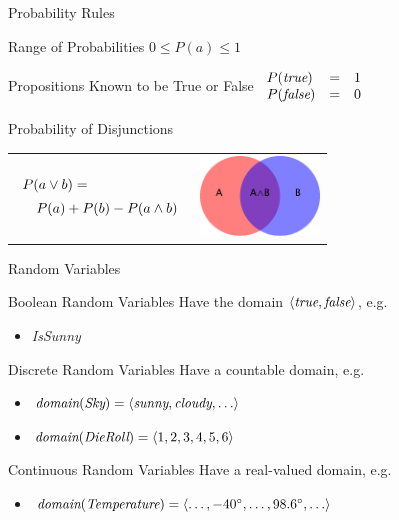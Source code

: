 \documentclass[12pt]{beamer}
\newcommand{\EM}[1]{\mbox{\em#1}}
\begin{document}
\begin{frame}{Probability Rules}
	\begin{block}{Range of Probabilities}
		$0 \leq P(a) \leq 1$
	\end{block}
	\pause
	\begin{block}{Propositions Known to be True or False}
		$
		\begin{array}{lll}
			P(\EM{true})  & = & 1 \\
			P(\EM{false}) & = & 0 \\
		\end{array}
		$
	\end{block}
	\pause
	\begin{block}{Probability of Disjunctions}
		\begin{tabular}{lc}
			$
			\begin{array}{lc}
				\lefteqn{P(a \lor b) = \mbox{}} \\[.5em]
				& P(a) + P(b) - P(a \land b)
			\end{array}
			$
			&
			\pause
			\parbox{1.25in}{\includegraphics[width=1.25in]{venn}}
		\end{tabular}
	\end{block}
\end{frame}
\begin{frame}{Random Variables}
	\begin{block}{Boolean Random Variables}
		Have the domain $\langle \EM{true}, \EM{false} \rangle$, e.g.
		\begin{itemize}
			\item \EM{IsSunny}
		\end{itemize}
	\end{block}
	\pause
	\begin{block}{Discrete Random Variables}
		Have a countable domain, e.g.
		\begin{itemize}
			\item $\EM{domain}(\EM{Sky}) =
			       \langle \EM{sunny}, \EM{cloudy}, \ldots \rangle$
			\item $\EM{domain}(\EM{DieRoll}) =
			       \langle 1, 2, 3, 4, 5, 6 \rangle$
		\end{itemize}
	\end{block}
	\pause
	\begin{block}{Continuous Random Variables}
		Have a real-valued domain, e.g.
		\begin{itemize}
			\item $\EM{domain}(\EM{Temperature}) =
			       \langle \ldots, -40^{\circ}, \ldots, 98.6^{\circ}, \ldots \rangle$
		\end{itemize}
	\end{block}
\end{frame}
\end{document}
